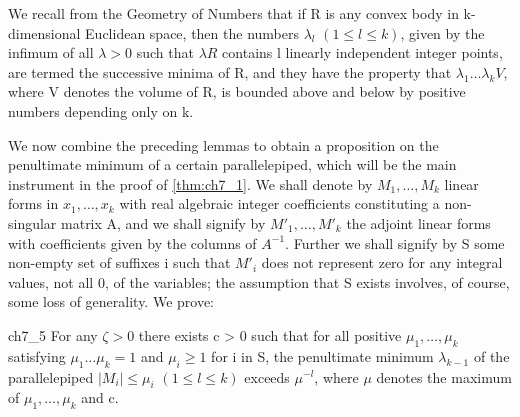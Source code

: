 We recall from the Geometry of Numbers that if R is any convex body in k-dimensional Euclidean space, then the numbers  $\lambda_l$   $(1 \le l \le k)$, given by the infimum of all  $\lambda > 0$  such that  $\lambda R$  contains l linearly independent integer points, are termed the successive minima of R, and they have the property that  $\lambda_1 \dots \lambda_k V$, where V denotes the volume of R, is bounded above and below by positive numbers depending only on k.

We now combine the preceding lemmas to obtain a proposition on the penultimate minimum of a certain parallelepiped, which will be the main instrument in the proof of \autoref{thm:ch7_1}. We shall denote by  $M_1, \ldots, M_k$  linear forms in  $x_1, \ldots, x_k$  with real algebraic integer coefficients constituting a non-singular matrix A, and we shall signify by  $M'_1, \ldots, M'_k$  the adjoint linear forms with coefficients given by the columns of  $A^{-1}$. Further we shall signify by S some non-empty set of suffixes i such that  $M'_i$  does not represent zero for any integral values, not all 0, of the variables; the assumption that S exists involves, of course, some loss of generality. We prove:

\begin{mylemma}{}{ch7_5}
For any  $\zeta > 0$  there exists c > 0 such that for all positive  $\mu_1, \ldots, \mu_k$  satisfying  $\mu_1 \ldots \mu_k = 1$  and  $\mu_i \ge 1$  for i in S, the penultimate minimum  $\lambda_{k-1}$  of the parallelepiped  $|M_i| \le \mu_i$   $(1 \le l \le k)$  exceeds  $\mu^{-l}$, where  $\mu$  denotes the maximum of  $\mu_1, \ldots, \mu_k$  and c.
\end{mylemma}

